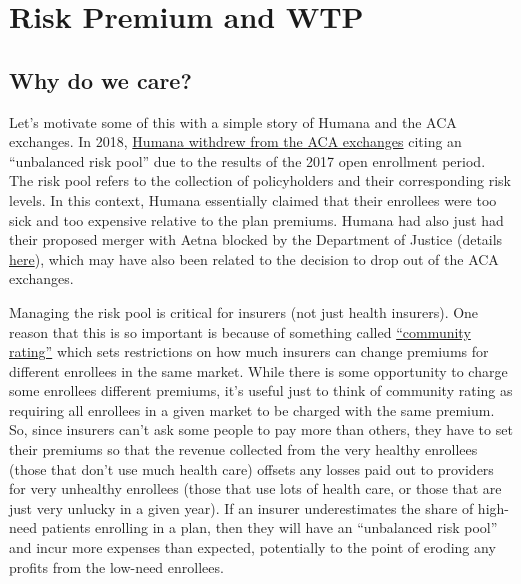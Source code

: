 \documentclass[
  letterpaper,
  DIV=11,
  numbers=noendperiod]{scrreport}
\theoremstyle{definition}
\theoremstyle{remark}
\begin{document}
\hypertarget{risk-premium-and-wtp}{%
\chapter{Risk Premium and WTP}\label{risk-premium-and-wtp}}

\hypertarget{why-do-we-care}{%
\section{Why do we care?}\label{why-do-we-care}}

Let's motivate some of this with a simple story of Humana and the ACA
exchanges. In 2018,
\href{https://money.cnn.com/2017/02/14/news/economy/humana-obamacare-insurer}{Humana
withdrew from the ACA exchanges} citing an ``unbalanced risk pool'' due
to the results of the 2017 open enrollment period. The risk pool refers
to the collection of policyholders and their corresponding risk levels.
In this context, Humana essentially claimed that their enrollees were
too sick and too expensive relative to the plan premiums. Humana had
also just had their proposed merger with Aetna blocked by the Department
of Justice (details
\href{https://www.npr.org/sections/thetwo-way/2017/02/14/515167491/aetna-and-humana-call-off-merger-after-court-decision}{here}),
which may have also been related to the decision to drop out of the ACA
exchanges.

Managing the risk pool is critical for insurers (not just health
insurers). One reason that this is so important is because of something
called
\href{https://www.healthcare.gov/glossary/community-rating/}{``community
rating''} which sets restrictions on how much insurers can change
premiums for different enrollees in the same market. While there is some
opportunity to charge some enrollees different premiums, it's useful
just to think of community rating as requiring all enrollees in a given
market to be charged with the same premium. So, since insurers can't ask
some people to pay more than others, they have to set their premiums so
that the revenue collected from the very healthy enrollees (those that
don't use much health care) offsets any losses paid out to providers for
very unhealthy enrollees (those that use lots of health care, or those
that are just very unlucky in a given year). If an insurer
underestimates the share of high-need patients enrolling in a plan, then
they will have an ``unbalanced risk pool'' and incur more expenses than
expected, potentially to the point of eroding any profits from the
low-need enrollees.
\end{document}
